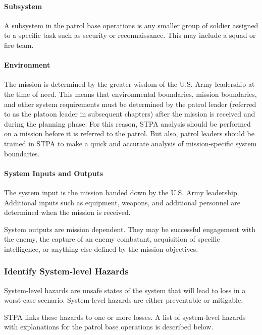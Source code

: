 \documentclass[../../main/main.tex]{subfiles}
\begin{document}
\paragraph*{Subsystem}
A subsystem in the patrol base operations is any smaller group of soldier assigned to a specific task such as security or reconnaissance.  This may include a squad or fire team.  

\paragraph*{Environment}
The mission is determined by the greater-wisdom of the U.S. Army leadership at the time of need.  This means that environmental boundaries, mission boundaries, and other system requirements must be determined by the patrol leader  (referred to as the platoon leader in subsequent chapters) after the mission is received and during the planning phase.  For this reason, STPA analysis should be performed on a mission before it is referred to the patrol.  But also, patrol leaders should be trained in STPA to make a quick and accurate analysis of mission-specific system boundaries.  


\paragraph*{System Inputs and Outputs}
The system input is the mission handed down by the U.S. Army leadership.  Additional inputs such as equipment, weapons, and additional personnel are determined when the mission is received. 

System outputs are mission dependent.  They may be successful engagement with the enemy, the capture of an enemy combatant, acquisition of specific intelligence, or anything else defined by the mission objectives.

\subsubsection{Identify System-level Hazards}
System-level hazards are unsafe states of the system that will lead to loss in a worst-case scenario.  System-level hazards are either preventable or mitigable.

STPA links these hazards to one or more losses.  A list of system-level hazards with explanations for the patrol base operations is described below.
\end{document}
